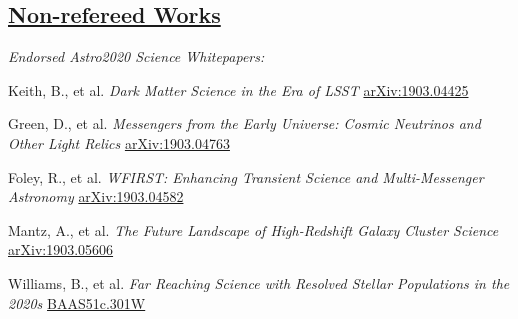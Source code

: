 \documentclass[margin]{res}
\begin{document}
\begin{resume}
\newpage
\section{\href{https://ui.adsabs.harvard.edu/\#search/q=orcid\%3A\%220000-0002-1873-8973\%22&sort=date\%20desc\%2C\%20bibcode\%20desc}{Non-refereed Works}}



\textit{Endorsed Astro2020 Science Whitepapers:}

\vspace{-12pt}\hspace{15pt}\hangindent=30pt 
Keith, B., et al. \textit{Dark Matter Science in the Era of LSST}
\href{https://ui.adsabs.harvard.edu/abs/2019arXiv190304425B/abstract}{arXiv:1903.04425}

\vspace{-12pt}\hspace{15pt}\hangindent=30pt 
Green, D., et al. \textit{Messengers from the Early Universe: Cosmic Neutrinos and Other Light Relics}
\href{https://ui.adsabs.harvard.edu/abs/2019arXiv190304763G/abstract}{arXiv:1903.04763}

\vspace{-12pt}\hspace{15pt}\hangindent=30pt 
Foley, R., et al. \textit{WFIRST: Enhancing Transient Science and Multi-Messenger Astronomy}
\href{https://ui.adsabs.harvard.edu/abs/2019arXiv190304582F/abstract}{arXiv:1903.04582}

\vspace{-12pt}\hspace{15pt}\hangindent=30pt
Mantz, A., et al. \textit{The Future Landscape of High-Redshift Galaxy Cluster Science}
\href{https://ui.adsabs.harvard.edu/abs/2019BAAS...51c.279M/abstract}{arXiv:1903.05606}

\vspace{-12pt}\hspace{15pt}\hangindent=30pt 
Williams, B., et al. \textit{Far Reaching Science with Resolved Stellar Populations in the 2020s}
\href{https://ui.adsabs.harvard.edu/abs/2019BAAS...51c.301W/abstract}{BAAS51c.301W}


\end{resume}
\end{document}
